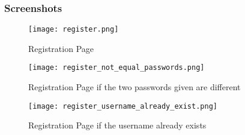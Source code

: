 \subsubsection{Screenshots}
\begin{figure}[H]
  \centering
  \texttt{[image: register.png]}
  \caption{Registration Page}
\end{figure}
\begin{figure}[H]
  \centering
  \texttt{[image: register\_not\_equal\_passwords.png]}
  \caption{Registration Page if the two passwords given are different}
\end{figure}
\begin{figure}[H]
  \centering
  \texttt{[image: register\_username\_already\_exist.png]}
  \caption{Registration Page if the username already exists}
\end{figure}